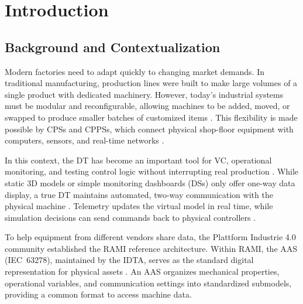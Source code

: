 
%

\chapter{Introduction}
\label{cha:introduction}


\epigraphfontsize{\small\itshape}
\setlength\epigraphwidth{12.5cm}
\setlength\epigraphrule{0pt}

\section{Background and Contextualization}

Modern factories need to adapt quickly to changing market demands. In traditional manufacturing, production lines were built to make large volumes of a single product with dedicated machinery. However, today's industrial systems must be modular and reconfigurable, allowing machines to be added, moved, or swapped to produce smaller batches of customized items \cite{Khan2025}. This flexibility is made possible by \glspl{CPS} and \glspl{CPPS}, which connect physical shop-floor equipment with computers, sensors, and real-time networks \cite{Abdel-Aty2022,Rocha2024}.

In this context, the \gls{DT} has become an important tool for \gls{VC}, operational monitoring, and testing control logic without interrupting real production \cite{Tao2019}. While static 3D models or simple monitoring dashboards (\glspl{DS}) only offer one-way data display, a true \gls{DT} maintains automated, two-way communication with the physical machine \cite{Kritzinger2018}. Telemetry updates the virtual model in real time, while simulation decisions can send commands back to physical controllers \cite{Pajpach2023}.

To help equipment from different vendors share data, the Plattform Industrie 4.0 community established the \gls{RAMI} reference architecture. Within \gls{RAMI}, the \gls{AAS} (\gls{IEC}~63278), maintained by the \gls{IDTA}, serves as the standard digital representation for physical assets \cite{Lu2025}. An \gls{AAS} organizes mechanical properties, operational variables, and communication settings into standardized submodels, providing a common format to access machine data.

